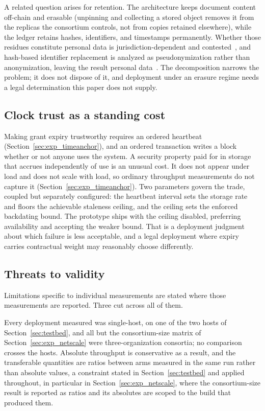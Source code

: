 \documentclass[preprint,12pt]{elsarticle}
\begin{document}
A related question arises for retention. The architecture keeps document
content off-chain and erasable (unpinning and collecting a stored object
removes it from the replicas the consortium controls, not from copies retained
elsewhere), while the ledger retains hashes, identifiers, and timestamps
permanently. Whether those residues constitute personal data is
jurisdiction-dependent and contested~\cite{gdpr2016,lyons2018integration}, and
hash-based identifier replacement is analyzed as pseudonymization rather than
anonymization, leaving the result personal
data~\cite{Finck2020,EDPB2025Pseudonymisation}. The decomposition narrows the
problem; it does not dispose of it, and deployment under an erasure regime
needs a legal determination this paper does not supply.

\subsection{Clock trust as a standing cost}
\label{sec:clocktrustprice}

Making grant expiry trustworthy requires an ordered heartbeat
(Section~\ref{sec:exp_timeanchor}), and an ordered transaction writes a block
whether or not anyone uses the system. A security property paid for in
storage that accrues independently of use is an unusual cost. It does not
appear under load and does not scale with load, so ordinary throughput
measurements do not capture it (Section~\ref{sec:exp_timeanchor}). Two
parameters govern the trade, coupled but separately configured: the heartbeat
interval sets the storage rate and floors the achievable staleness ceiling,
and the ceiling sets the enforced backdating bound. The
prototype ships with the ceiling disabled, preferring availability and accepting
the weaker bound. That is a deployment judgment about which failure is less
acceptable, and a legal deployment where expiry carries contractual weight may
reasonably choose differently.

\subsection{Threats to validity}
\label{sec:validity}

Limitations specific to individual measurements are stated where those
measurements are reported. Three cut across all of them.

Every deployment measured was single-host, on one of the two hosts of
Section~\ref{sec:testbed}, and all but the consortium-size matrix of
Section~\ref{sec:exp_netscale} were three-organization consortia; no
comparison crosses the hosts. Absolute throughput is conservative as a result, and the
transferable quantities are ratios between arms measured in the same run rather
than absolute values, a constraint stated in Section~\ref{sec:testbed} and
applied throughout, in particular in Section~\ref{sec:exp_netscale}, where
the consortium-size result is reported as
ratios and its absolutes are scoped to the build that produced them.
\end{document}
